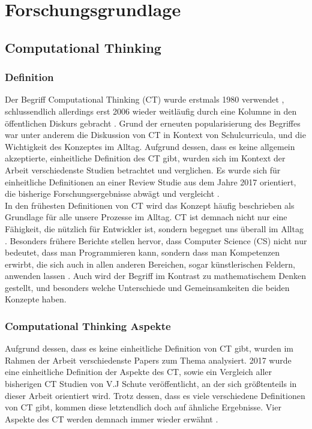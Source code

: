 \clearpage
\section{Forschungsgrundlage}
\label{sec:research}

\subsection{Computational Thinking}

\subsubsection{Definition}
Der Begriff Computational Thinking (CT) wurde erstmals 1980 verwendet \cite{papert}, schlussendlich allerdings erst 2006 wieder weitläufig durch eine Kolumne in den öffentlichen Diskurs gebracht \cite{wing2006}.
Grund der erneuten popularisierung des Begriffes war unter anderem die Diskussion von CT in Kontext von Schulcurricula, und die Wichtigkeit des Konzeptes im Alltag.
Aufgrund dessen, dass es keine allgemein akzeptierte, einheitliche Definition des CT gibt, wurden sich im Kontext der Arbeit verschiedenste Studien betrachtet und verglichen. Es wurde sich für einheitliche Definitionen an einer Review Studie aus dem Jahre 2017 orientiert, die bisherige Forschungsergebnisse abwägt und vergleicht \cite{schute}.
\\
In den frühesten Definitionen von CT wird das Konzept häufig beschrieben als Grundlage für alle unsere Prozesse im Alltag. CT ist demnach nicht nur eine Fähigkeit, die nützlich für Entwickler ist, sondern begegnet uns überall im Alltag \cite{khine17}. Besonders frühere Berichte stellen hervor, dass Computer Science (CS) nicht nur bedeutet, dass man Programmieren kann, sondern dass man Kompetenzen erwirbt, die sich auch in allen anderen Bereichen, sogar künstlerischen Feldern, anwenden lassen \cite{wing2006}.
Auch wird der Begriff im Kontrast zu mathematischem Denken gestellt, und besonders welche Unterschiede und Gemeinsamkeiten die beiden Konzepte haben.

\subsubsection{Computational Thinking Aspekte}
Aufgrund dessen, dass es keine einheitliche Definition von CT gibt, wurden im Rahmen der Arbeit verschiedenste Papers zum Thema analysiert. 2017 wurde eine einheitliche Definition der Aspekte des CT, sowie ein Vergleich aller bisherigen CT Studien von V.J Schute \cite{schute} veröffentlicht, an der sich größtenteils in dieser Arbeit orientiert wird.
Trotz dessen, dass es viele verschiedene Definitionen von CT gibt, kommen diese letztendlich doch auf ähnliche Ergebnisse. Vier Aspekte des CT werden demnach immer wieder erwähnt \cite{schute}.


